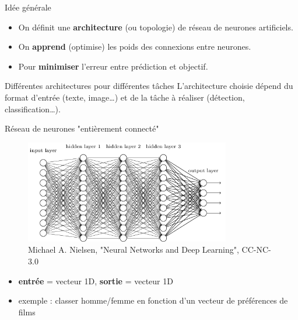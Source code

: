 \documentclass{beamer}
\begin{document}
\begin{frame}{Idée générale}  
\begin{itemize}
	\item On définit une \textbf{architecture} (ou topologie) de réseau de neurones artificiels.
    \item On \textbf{apprend} (optimise) les poids des connexions entre neurones.
    \item Pour \textbf{minimiser} l'erreur entre prédiction et objectif.
\end{itemize}

\begin{alertblock}{Différentes architectures pour différentes tâches}
L'architecture choisie dépend du format d'entrée (texte, image\dots) et de la tâche à réaliser (détection, classification\dots).
\end{alertblock}
\end{frame}

\begin{frame}{Réseau de neurones "entièrement connecté"}  
\begin{figure}
	\includegraphics[width=0.8\textwidth]{fully_connected}\\
    \tiny{Michael A. Nielsen, "Neural Networks and Deep Learning", CC-NC-3.0}
\end{figure}
\centering
\begin{itemize}
	\item \textbf{entrée} = vecteur 1D, \textbf{sortie} = vecteur 1D
    \item exemple : classer homme/femme en fonction d'un vecteur de préférences de films
 \end{itemize}
\end{frame}
\end{document}
